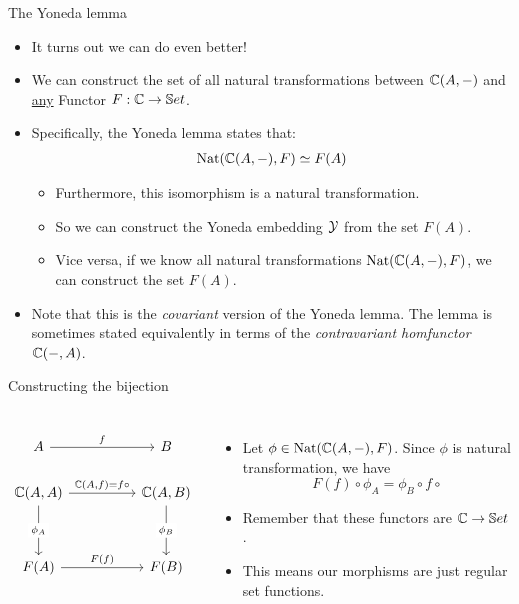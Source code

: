 \begin{frame}{The Yoneda lemma}
	\begin{itemize}
		\item It turns out we can do even better!
		\pause\item We can construct the set of all natural transformations between $\mathbb{C}(A, -)$ and \underline{any} Functor $F :\mathbb{C} \to \mathbb{S} et$.
		\pause\item Specifically, the Yoneda lemma states that:
		\begin{align*}
			\text{Nat}(\mathbb{C}(A,-), F) \simeq F(A)
		\end{align*}
		\begin{itemize}
			\vspace{-18pt}\pause\item Furthermore, this isomorphism is a natural transformation.
			\pause\item So we can construct the Yoneda embedding $\mathcal{Y}$ from the set $F(A)$.
			\pause\item Vice versa, if we know all natural transformations $\text{Nat}(\mathbb{C}(A,-), F)$, we can construct the set $F(A)$.
		\end{itemize}
		\pause\item Note that this is the \textit{covariant} version of the Yoneda lemma. The lemma is sometimes stated equivalently in terms of the \textit{contravariant homfunctor}  $\mathbb{C}(-,A)$.
	\end{itemize}
\end{frame}

\begin{frame}[fragile]{Constructing the bijection}
	\begin{columns}
		\[\begin{tikzcd}
			A && B \\
			{\bC(A,A)} && {\bC(A,B)} \\
			\\
			{F(A)} && {F(B)}
			\arrow["f", from=1-1, to=1-3]
			\arrow["{\bC(A,f) = f \circ}", from=2-1, to=2-3]
			\arrow["{\phi_A}"{description}, from=2-1, to=4-1]
			\arrow["{\phi_B}"{description}, from=2-3, to=4-3]
			\arrow["{F(f)}", from=4-1, to=4-3]
		\end{tikzcd}\]
		
		\begin{itemize}
			\item Let $\phi \in \text{Nat}(\mathbb{C}(A,-), F)$. Since $\phi$ is natural transformation, we have
			\[F(f) \circ \phi_A = \phi_B \circ f \circ\]
			\pause\item Remember that these functors are $\mathbb{C} \to \mathbb{S} et$.
			\pause\item This means our morphisms are just regular set functions.
		\end{itemize}
	\end{columns}
\end{frame}

